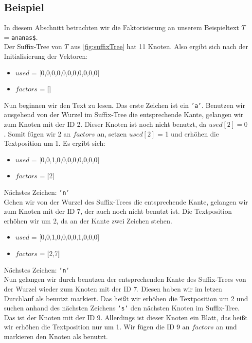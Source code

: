 \documentclass[a4paper,11pt]{scrartcl}%
\theoremstyle{change}
\theoremstyle{nonumberplain}
\theoremstyle{change}
\theoremstyle{nonumberplain}
\theoremstyle{change}
\theoremstyle{nonumberplain}
\begin{document}
\subsection{Beispiel}\label{example:fact}

In diesem Abschnitt betrachten wir die Faktorisierung an unserem Beispieltext $T$ = \texttt{ananas\$}.\\
Der Suffix-Tree von $T$ aus \autoref{fig:suffixTree} hat 11 Knoten. Also ergibt sich nach der Initialisierung der Vektoren:
\begin{itemize}
	\item $used$ = [0,0,0,0,0,0,0,0,0,0,0]
	\item $factors$ = []
\end{itemize}

Nun beginnen wir den Text zu lesen. Das erste Zeichen ist ein \texttt{'a'}. Benutzen wir ausgehend von der Wurzel im Suffix-Tree die entsprechende Kante, gelangen wir zum Knoten mit der ID 2. Dieser Knoten ist noch nicht benutzt, da $used[2] = 0$. Somit fügen wir 2 an $factors$ an, setzen $used[2]$ = 1 und erhöhen die Textposition um 1. Es ergibt sich:
\begin{itemize}
	\item $used$ = [0,0,1,0,0,0,0,0,0,0,0]
	\item $factors$ = [2]
\end{itemize}

Nächstes Zeichen: \texttt{'n'}\\
Gehen wir von der Wurzel des Suffix-Trees die entsprechende Kante, gelangen wir zum Knoten mit der ID 7, der auch noch nicht benutzt ist. Die Textposition erhöhen wir um 2, da an der Kante zwei Zeichen stehen.

\begin{itemize}
	\item $used$ = [0,0,1,0,0,0,0,1,0,0,0]
	\item $factors$ = [2,7]
\end{itemize}

Nächstes Zeichen: \texttt{'n'}\\
Nun gelangen wir durch benutzen der entsprechenden Kante des Suffix-Trees von der Wurzel  wieder zum Knoten mit der ID 7. Diesen haben wir im letzen Durchlauf als benutzt markiert. Das heißt wir erhöhen die Textposition um 2 und suchen anhand des nächsten Zeichens \texttt{'s'} den nächsten Knoten im Suffix-Tree. Das ist der Knoten mit der ID 9. Allerdings ist dieser Knoten ein Blatt, das heißt wir erhöhen die Textposition nur um 1. Wir fügen die ID 9 an $factors$ an und markieren den Knoten als benutzt.
\end{document}
